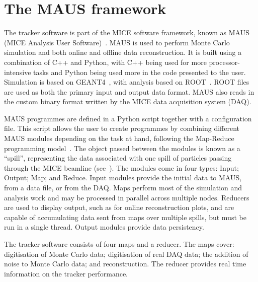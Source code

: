 \section{The MAUS framework}
\label{sec:MAUS}
The tracker software is part of the MICE software framework, known as MAUS (MICE Analysis User Software)~\cite{MausIPAC11}. MAUS is used to perform Monte Carlo simulation and both online and offline data reconstruction. It is built using a combination of C++ and Python, with C++ being used for more processor-intensive tasks and Python being used more in the code presented to the user.  Simulation is based on GEANT4~\cite{GEANT4}, with analysis based on ROOT~\cite{ROOT}.  ROOT files are used as both the primary input and output data format. MAUS also reads in the custom binary format written by the MICE data acquisition system (DAQ). 

MAUS programmes are defined in a Python script together with a configuration file.  This script allows the user to create programmes by combining different MAUS modules depending on the task at hand, following the Map-Reduce programming model~\cite{MapReduce}. The object passed between the modules is known as a ``spill'', representing the data associated with one spill of particles passing through the MICE beamline (see~\cite{MiceBeamline}).  The modules come in four types: Input; Output; Map; and Reduce.  Input modules provide the initial data to MAUS, from a data file, or from the DAQ. Maps perform most of the simulation and analysis work and may be processed in parallel across multiple nodes.  Reducers are used to display output, such as for online reconstruction plots, and are capable of accumulating data sent from maps over multiple spills, but must be run in a single thread. Output modules provide data persistency.

The tracker software consists of four maps and a reducer. The maps cover: digitisation of Monte Carlo data; digitisation of real DAQ data; the addition of noise to Monte Carlo data; and reconstruction. The reducer provides real time information on the tracker performance.  %